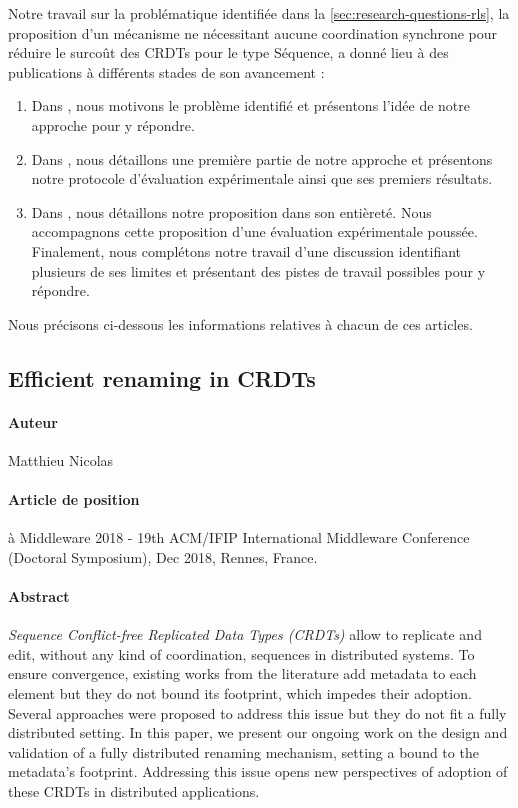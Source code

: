 Notre travail sur la problématique identifiée dans la \autoref{sec:research-questions-rls}, \ie la proposition d'un mécanisme ne nécessitant aucune coordination synchrone pour réduire le surcoût des \acp{CRDT} pour le type Séquence, a donné lieu à des publications à différents stades de son avancement :
\begin{enumerate}
    \item Dans \cite{2018-rls-middleware-nicolas}, nous motivons le problème identifié et présentons l'idée de notre approche pour y répondre.
    \item Dans \cite{2020-rls-papoc-nicolas}, nous détaillons une première partie de notre approche et présentons notre protocole d'évaluation expérimentale ainsi que ses premiers résultats.
    \item Dans \cite{2022-rls-tpds-nicolas}, nous détaillons notre proposition dans son entièreté.
        Nous accompagnons cette proposition d'une évaluation expérimentale poussée.
        Finalement, nous complétons notre travail d'une discussion identifiant plusieurs de ses limites et présentant des pistes de travail possibles pour y répondre.
\end{enumerate}
Nous précisons ci-dessous les informations relatives à chacun de ces articles.

\subsection*{Efficient renaming in CRDTs \cite{2018-rls-middleware-nicolas}}

\paragraph{Auteur} Matthieu Nicolas

\paragraph{Article de position} à Middleware 2018 - 19th ACM/IFIP International Middleware Conference (Doctoral Symposium), Dec 2018, Rennes, France.

\paragraph{Abstract}
\emph{Sequence Conflict-free Replicated Data Types (CRDTs)} allow to replicate and edit, without any kind of coordination, sequences in distributed systems.
To ensure convergence, existing works from the literature add metadata to each element but they do not bound its footprint, which impedes their adoption.
Several approaches were proposed to address this issue but they do not fit a fully distributed setting.
In this paper, we present our ongoing work on the design and validation of a fully distributed renaming mechanism, setting a bound to the metadata's footprint.
Addressing this issue opens new perspectives of adoption of these CRDTs in distributed applications.

